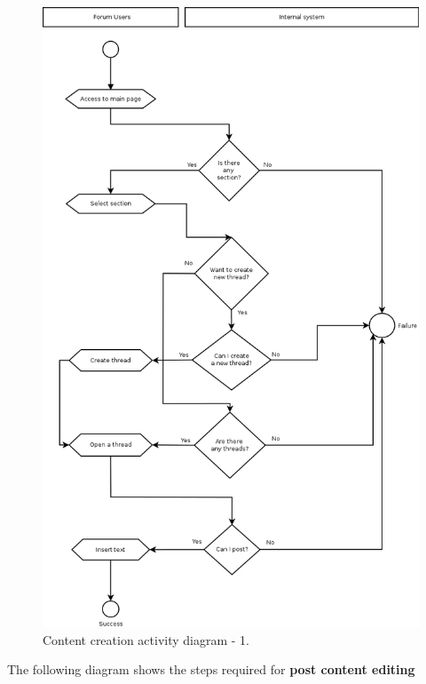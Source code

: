\documentclass[12pt]{report}
\renewcommand\emph{\textbf}
\begin{document}
                    \begin{figure}[H]
                    \caption{Content creation activity diagram - 1.}
                    \centering
                    \includegraphics[width=1\textwidth]{di/3}
                    \end{figure}

                    \newpage

                    The following diagram shows the steps required for \emph{post content editing}
\end{document}
